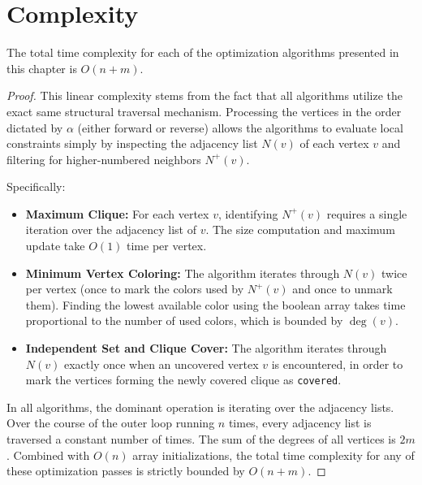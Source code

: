 
\section{Complexity}

\begin{theorem}
The total time complexity for each of the optimization algorithms presented in this chapter is $O(n + m)$.
\end{theorem}

\begin{proof}
This linear complexity stems from the fact that all algorithms utilize the exact same structural traversal mechanism. Processing the vertices in the order dictated by $\alpha$ (either forward or reverse) allows the algorithms to evaluate local constraints simply by inspecting the adjacency list $N(v)$ of each vertex $v$ and filtering for higher-numbered neighbors $N^+(v)$.

Specifically:
\begin{itemize}
    \item \textbf{Maximum Clique:} For each vertex $v$, identifying $N^+(v)$ requires a single iteration over the adjacency list of $v$. The size computation and maximum update take $O(1)$ time per vertex. 
    \item \textbf{Minimum Vertex Coloring:} The algorithm iterates through $N(v)$ twice per vertex (once to mark the colors used by $N^+(v)$ and once to unmark them). Finding the lowest available color using the boolean array takes time proportional to the number of used colors, which is bounded by $\deg(v)$.
    \item \textbf{Independent Set and Clique Cover:} The algorithm iterates through $N(v)$ exactly once when an uncovered vertex $v$ is encountered, in order to mark the vertices forming the newly covered clique as \texttt{covered}.
\end{itemize}

In all algorithms, the dominant operation is iterating over the adjacency lists. Over the course of the outer loop running $n$ times, every adjacency list is traversed a constant number of times. The sum of the degrees of all vertices is $2m$. Combined with $O(n)$ array initializations, the total time complexity for any of these optimization passes is strictly bounded by $O(n + m)$.
\end{proof}